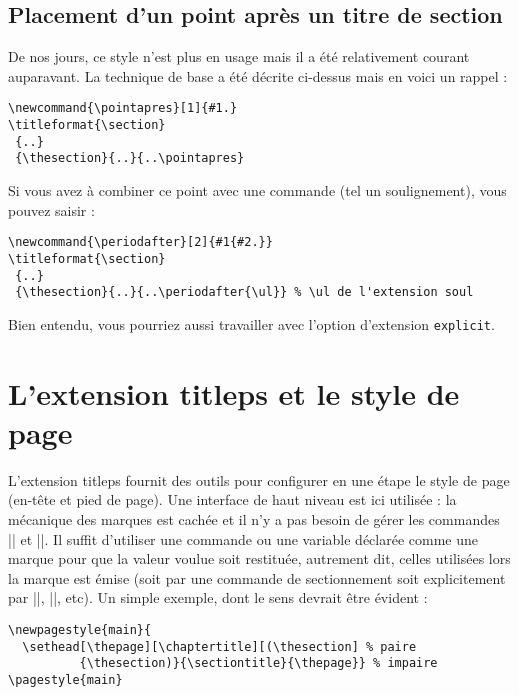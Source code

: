 \documentclass[a4paper]{ltxguide}
\begin{document}
\subsection{Placement d'un point après un titre de section} \label{sec:dotafter}

De nos jours, ce style n'est plus en usage mais il a été relativement courant
auparavant. La technique de base a été décrite ci-dessus mais en voici un
rappel :
\begin{verbatim}
\newcommand{\pointapres}[1]{#1.}
\titleformat{\section}
 {..}
 {\thesection}{..}{..\pointapres}
\end{verbatim}

Si vous avez à combiner ce point avec une commande (tel un soulignement), vous
pouvez saisir :
\begin{verbatim}
\newcommand{\periodafter}[2]{#1{#2.}}
\titleformat{\section}
 {..}
 {\thesection}{..}{..\periodafter{\ul}} % \ul de l'extension soul
\end{verbatim}

Bien entendu, vous pourriez aussi travailler avec l'option d'extension 
\texttt{explicit}.

\section{L'extension \textsf{titleps} et le style de page}

L'extension \textsf{titleps} fournit des outils pour configurer en une étape
le style de page (en-tête et pied de page). Une interface de haut niveau est
ici utilisée : la mécanique des marques est cachée et il n'y a pas besoin de
gérer les commandes |\leftmark| et |\rightmark|. Il suffit d'utiliser une
commande ou une variable déclarée comme une \og marque \fg{} pour que la valeur
voulue soit restituée, autrement dit, celles utilisées lors la marque est émise
(soit par une commande de sectionnement soit explicitement par |\chaptermark|, 
|\sectionmark|, etc). Un simple exemple, dont le sens devrait être évident :
\begin{verbatim}
\newpagestyle{main}{
  \sethead[\thepage][\chaptertitle][(\thesection] % paire
          {\thesection)}{\sectiontitle}{\thepage}} % impaire
\pagestyle{main}
\end{verbatim}
\end{document}

